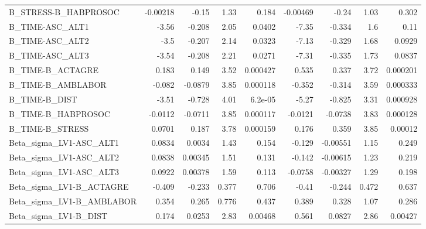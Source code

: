 \begin{tabular}{lrrrrrrrr}
B\_STRESS-B\_HABPROSOC          &    -0.00218 &        -0.15 &    1.33 &    0.184 &   -0.00469 &       -0.24 &         1.03 &         0.302 \\
B\_TIME-ASC\_ALT1               &       -3.56 &       -0.208 &    2.05 &   0.0402 &      -7.35 &      -0.334 &          1.6 &          0.11 \\
B\_TIME-ASC\_ALT2               &        -3.5 &       -0.207 &    2.14 &   0.0323 &      -7.13 &      -0.329 &         1.68 &        0.0929 \\
B\_TIME-ASC\_ALT3               &       -3.54 &       -0.208 &    2.21 &   0.0271 &      -7.31 &      -0.335 &         1.73 &        0.0837 \\
B\_TIME-B\_ACTAGRE              &       0.183 &        0.149 &    3.52 & 0.000427 &      0.535 &       0.337 &         3.72 &      0.000201 \\
B\_TIME-B\_AMBLABOR             &      -0.082 &      -0.0879 &    3.85 & 0.000118 &     -0.352 &      -0.314 &         3.59 &      0.000333 \\
B\_TIME-B\_DIST                 &       -3.51 &       -0.728 &    4.01 &  6.2e-05 &      -5.27 &      -0.825 &         3.31 &      0.000928 \\
B\_TIME-B\_HABPROSOC            &     -0.0112 &      -0.0711 &    3.85 & 0.000117 &    -0.0121 &     -0.0738 &         3.83 &      0.000128 \\
B\_TIME-B\_STRESS               &      0.0701 &        0.187 &    3.78 & 0.000159 &      0.176 &       0.359 &         3.85 &       0.00012 \\
Beta\_sigma\_LV1-ASC\_ALT1       &      0.0834 &       0.0034 &    1.43 &    0.154 &     -0.129 &    -0.00551 &         1.15 &         0.249 \\
Beta\_sigma\_LV1-ASC\_ALT2       &      0.0838 &      0.00345 &    1.51 &    0.131 &     -0.142 &    -0.00615 &         1.23 &         0.219 \\
Beta\_sigma\_LV1-ASC\_ALT3       &      0.0922 &      0.00378 &    1.59 &    0.113 &    -0.0758 &    -0.00327 &         1.29 &         0.198 \\
Beta\_sigma\_LV1-B\_ACTAGRE      &      -0.409 &       -0.233 &   0.377 &    0.706 &      -0.41 &      -0.244 &        0.472 &         0.637 \\
Beta\_sigma\_LV1-B\_AMBLABOR     &       0.354 &        0.265 &   0.776 &    0.437 &      0.389 &       0.328 &         1.07 &         0.286 \\
Beta\_sigma\_LV1-B\_DIST         &       0.174 &       0.0253 &    2.83 &  0.00468 &      0.561 &      0.0827 &         2.86 &       0.00427 \\

\end{tabular}
